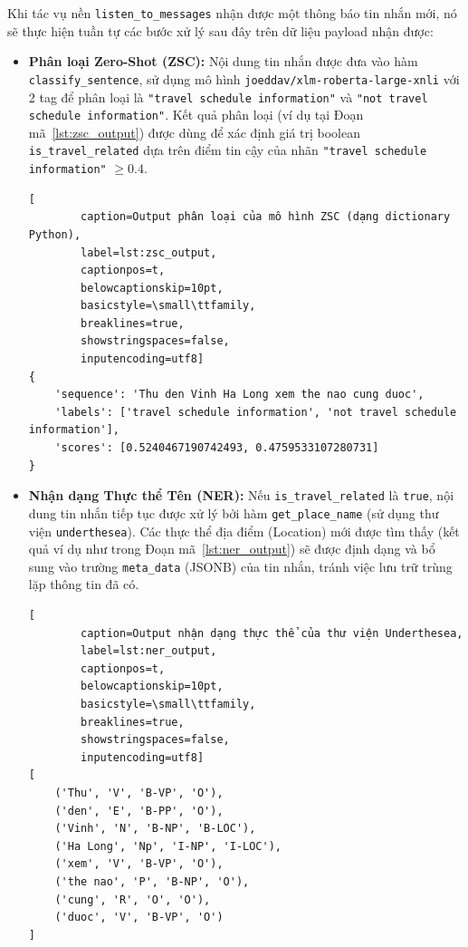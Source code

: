 \begin{enumerate}
\noindent Khi tác vụ nền \texttt{listen\_to\_messages} nhận được một thông báo tin nhắn mới, nó sẽ thực hiện tuần tự các bước xử lý sau đây trên dữ liệu payload nhận được:
\begin{itemize}
    \item \textbf{Phân loại Zero-Shot (ZSC):} Nội dung tin nhắn được đưa vào hàm \texttt{classify\_sentence}, sử dụng mô hình \texttt{joeddav/xlm-roberta-large-xnli} với 2 tag để phân loại là \texttt{"travel schedule information"} và \texttt{"not travel schedule information"}. Kết quả phân loại (ví dụ tại Đoạn mã~\ref{lst:zsc_output}) được dùng để xác định giá trị boolean \texttt{is\_travel\_related} dựa trên điểm tin cậy của nhãn \texttt{"travel schedule information"} $\geq 0.4$.
    \lstset{language=json}
    \begin{lstlisting}[
        caption=Output phân loại của mô hình ZSC (dạng dictionary Python),
        label=lst:zsc_output,
        captionpos=t,
        belowcaptionskip=10pt,
        basicstyle=\small\ttfamily,
        breaklines=true,
        showstringspaces=false,
        inputencoding=utf8] 
{
    'sequence': 'Thu den Vinh Ha Long xem the nao cung duoc',
    'labels': ['travel schedule information', 'not travel schedule information'],
    'scores': [0.5240467190742493, 0.4759533107280731]
}
    \end{lstlisting}
    \item \textbf{Nhận dạng Thực thể Tên (NER):} Nếu \texttt{is\_travel\_related} là \texttt{true}, nội dung tin nhắn tiếp tục được xử lý bởi hàm \texttt{get\_place\_name} (sử dụng thư viện \texttt{underthesea}). Các thực thể địa điểm (Location) mới được tìm thấy (kết quả ví dụ như trong Đoạn mã~\ref{lst:ner_output}) sẽ được định dạng và bổ sung vào trường \texttt{meta\_data} (JSONB) của tin nhắn, tránh việc lưu trữ trùng lặp thông tin đã có.
    \newpage
    \lstset{language=Python}
    \begin{lstlisting}[
        caption=Output nhận dạng thực thể của thư viện Underthesea,
        label=lst:ner_output, 
        captionpos=t,
        belowcaptionskip=10pt,
        basicstyle=\small\ttfamily,
        breaklines=true,
        showstringspaces=false,
        inputencoding=utf8] 
[
    ('Thu', 'V', 'B-VP', 'O'), 
    ('den', 'E', 'B-PP', 'O'),
    ('Vinh', 'N', 'B-NP', 'B-LOC'),
    ('Ha Long', 'Np', 'I-NP', 'I-LOC'), 
    ('xem', 'V', 'B-VP', 'O'),
    ('the nao', 'P', 'B-NP', 'O'),
    ('cung', 'R', 'O', 'O'),
    ('duoc', 'V', 'B-VP', 'O')
]
    \end{lstlisting}


\end{itemize}
\end{enumerate}
